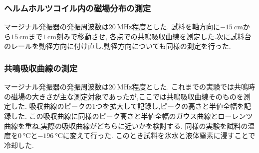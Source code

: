 \subsubsection{ヘルムホルツコイル内の磁場分布の測定}
マージナル発振器の発振周波数は$20\ \si{\mega\hertz}$程度とした.
試料を軸方向に$-15\ \si{\centi\metre}$から$15\ \si{\centi\metre}$まで$1\ \si{\centi\metre}$刻みで移動させ,
各点での共鳴吸収曲線を測定した.次に試料台のレールを動径方向に付け直し,動径方向についても同様の測定を行った.
\subsubsection{共鳴吸収曲線の測定}
マージナル発振器の発振周波数は$20\ \si{\mega\hertz}$程度とした.
これまでの実験では共鳴時の磁場の大きさが主な測定対象であったが,ここでは共鳴吸収曲線そのものを測定した.
吸収曲線のピークの1つを拡大して記録し,ピークの高さと半値全幅を記録した.
この吸収曲線に同様のピーク高さと半値全幅のガウス曲線とローレンツ曲線を重ね,実際の吸収曲線がどちらに近いかを検討する.
同様の実験を試料の温度を$0\ \si{\degreeCelsius}$と$-196\ \si{\degreeCelsius}$に変えて行った.
このとき試料を氷水と液体窒素に浸すことで冷却した.